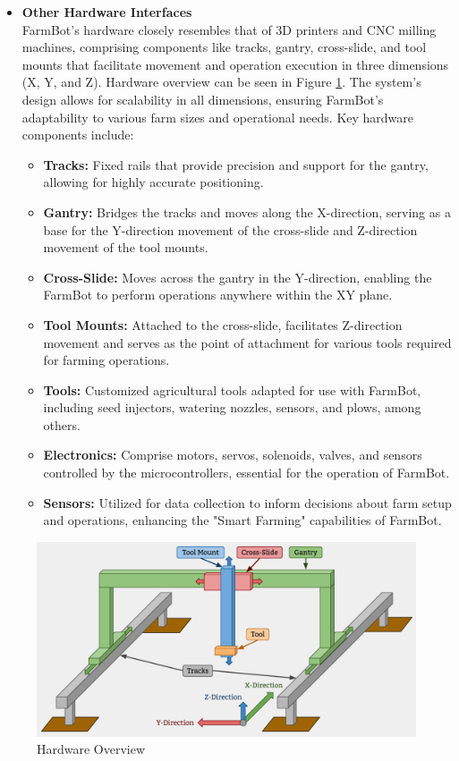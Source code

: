 \begin{itemize}
    \item \textbf{Other Hardware Interfaces}\\
    FarmBot's hardware closely resembles that of 3D printers and CNC milling machines, comprising components like tracks, gantry, cross-slide, and tool mounts that facilitate movement and operation execution in three dimensions (X, Y, and Z). Hardware overview can be seen in Figure \ref{Hardware Overview}. The system's design allows for scalability in all dimensions, ensuring FarmBot's adaptability to various farm sizes and operational needs. Key hardware components include:
    \begin{itemize}
        \item \textbf{Tracks:} Fixed rails that provide precision and support for the gantry, allowing for highly accurate positioning.
        \item \textbf{Gantry:} Bridges the tracks and moves along the X-direction, serving as a base for the Y-direction movement of the cross-slide and Z-direction movement of the tool mounts.
        \item \textbf{Cross-Slide:} Moves across the gantry in the Y-direction, enabling the FarmBot to perform operations anywhere within the XY plane.
        \item \textbf{Tool Mounts:} Attached to the cross-slide, facilitates Z-direction movement and serves as the point of attachment for various tools required for farming operations.
        \item \textbf{Tools:} Customized agricultural tools adapted for use with FarmBot, including seed injectors, watering nozzles, sensors, and plows, among others.
        \item \textbf{Electronics:} Comprise motors, servos, solenoids, valves, and sensors controlled by the microcontrollers, essential for the operation of FarmBot.
        \item \textbf{Sensors:} Utilized for data collection to inform decisions about farm setup and operations, enhancing the "Smart Farming" capabilities of FarmBot.
    \end{itemize}
\end{itemize}

\begin{figure}[htbp]
        \centering
        \includegraphics[width=1\linewidth]{Figures/hardware.png}
        \caption{Hardware Overview}
        \label{Hardware Overview}
\end{figure}

